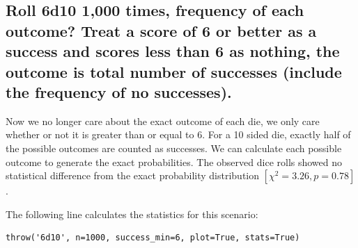 \documentclass{article}
\begin{document}

\subsection{Roll 6d10 1,000 times, frequency of each outcome? Treat a score of 6 or better as a success and scores less than 6 as nothing, the outcome is total number of successes (include the frequency of no successes).}

Now we no longer care about the exact outcome of each die, we only care whether or not it is greater than or equal to 6. For a 10 sided die, exactly half of the possible outcomes are counted as successes. We can calculate each possible outcome to generate the exact probabilities. The observed dice rolls showed no statistical difference from the exact probability distribution $[\chi^2=3.26, p=0.78]$.

The following line calculates the statistics for this scenario:
\begin{lstlisting}
throw('6d10', n=1000, success_min=6, plot=True, stats=True)
\end{lstlisting}
\end{document}
